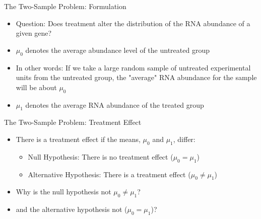 \documentclass[xcolor=x11names,compress]{beamer}\usepackage[]{graphicx}\usepackage[]{color}
\begin{document}
\begin{frame}{The Two-Sample Problem: Formulation}
  \begin{itemize}
  \item Question: Does treatment alter the distribution of the RNA abundance of a given gene?
  \item $\mu_0$ denotes the average abundance level of the untreated group
  \item In other words: If we take a large random sample of untreated experimental units from the untreated group,
        the "average" RNA abundance for the sample will be about $\mu_0$
    \item $\mu_1$ denotes the average RNA abundance of the treated group

  \end{itemize}
  
\end{frame}


\begin{frame}{The Two-Sample Problem: Treatment Effect}
  \begin{itemize}
  \item  There is a treatment effect if the means, $\mu_0$ and $\mu_1$, differ:
    \begin{itemize}
    \item Null Hypothesis: There is no treatment effect ($\mu_0=\mu_1$)
    \item Alternative Hypothesis: There is a treatment effect ($\mu_0\ne\mu_1$)
    \end{itemize}
  \item Why is the null hypothesis not $\mu_0\ne\mu_1$?
  \item and the alternative  hypothesis not ($\mu_0=\mu_1$)?
  \end{itemize}
\end{frame}
\end{document}
